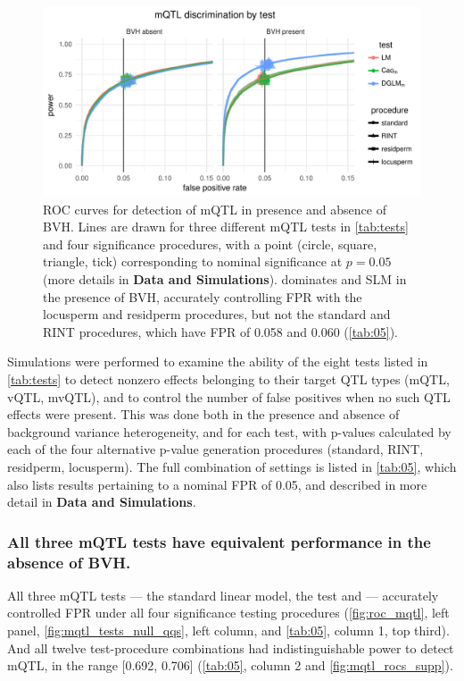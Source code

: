 \begin{figure}
  \centering
  \includegraphics[width = \linewidth]{images/simple_rocs_mqtl_all_facet_by_bvh.pdf}
  \caption[
    ROC curves for detection of mQTL in presence and absence of BVH.
  ]
  {
    ROC curves for detection of mQTL in presence and absence of BVH.
    Lines are drawn for three different mQTL tests in \autoref{tab:tests} and four significance procedures, with a point (circle, square, triangle, tick) corresponding to nominal significance at $p=0.05$ (more details in \textbf{Data and Simulations}).
    \DGLMm dominates \Caom and SLM in the presence of BVH, accurately controlling FPR with the locusperm and residperm procedures, but not the standard and RINT procedures, which have FPR of 0.058 and 0.060 (\autoref{tab:05}).
  }
  \label{fig:roc_mqtl}
\end{figure}

Simulations were performed to examine the ability of the eight tests listed in \autoref{tab:tests} to detect nonzero effects belonging to their target QTL types (mQTL, vQTL, mvQTL), and to control the number of false positives when no such QTL effects were present. This was done both in the presence and absence of background variance heterogeneity, and for each test, with p-values calculated by each of the four alternative p-value generation procedures (standard, RINT, residperm, locusperm). The full combination of settings is listed in \autoref{tab:05}, which also lists results pertaining to a nominal FPR of 0.05, and described in more detail in \textbf{Data and Simulations}.

\subsubsection{All three mQTL tests have equivalent performance in the absence of BVH.}

All three mQTL tests --- the standard linear model, the \Caom test and \DGLMm --- accurately controlled FPR under all four significance testing procedures (\autoref{fig:roc_mqtl}, left panel, \autoref{fig:mqtl_tests_null_qqs}, left column, and \autoref{tab:05}, column 1, top third).
And all twelve test-procedure combinations had indistinguishable power to detect mQTL, in the range [0.692, 0.706] (\autoref{tab:05}, column 2 and \autoref{fig:mqtl_rocs_supp}).

